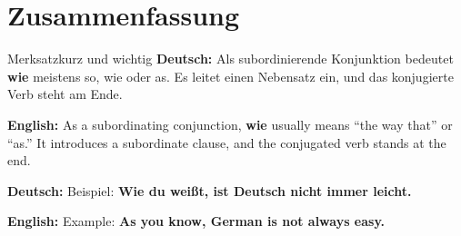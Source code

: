 \documentclass[a4paper,11pt]{article}
\newcommand{\GermanText}[1]{\textbf{Deutsch: }#1\par}
\newcommand{\EnglishText}[1]{{\small\color{SoftGray}\textbf{English: }#1\par}}
\begin{document}
\section{Zusammenfassung}

\begin{grammarentry}{Merksatz}{kurz und wichtig}
\GermanText{Als subordinierende Konjunktion bedeutet \textbf{wie} meistens \glqq so, wie\grqq{} oder \glqq as\grqq. Es leitet einen Nebensatz ein, und das konjugierte Verb steht am Ende.}
\EnglishText{As a subordinating conjunction, \textbf{wie} usually means ``the way that'' or ``as.'' It introduces a subordinate clause, and the conjugated verb stands at the end.}

\GermanText{Beispiel: \textbf{Wie du weißt, ist Deutsch nicht immer leicht.}}
\EnglishText{Example: \textbf{As you know, German is not always easy.}}
\end{grammarentry}
\end{document}
